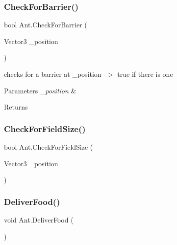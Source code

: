 \subsubsection{\texorpdfstring{CheckForBarrier()}{CheckForBarrier()}}
{\footnotesize\ttfamily bool Ant.\+Check\+For\+Barrier (\begin{DoxyParamCaption}\item[{Vector3}]{\+\_\+position }\end{DoxyParamCaption})\hspace{0.3cm}{\ttfamily [protected]}}



checks for a barrier at \+\_\+position -\/$>$ true if there is one 


\begin{DoxyParams}{Parameters}
{\em \+\_\+position} & \\
\hline
\end{DoxyParams}
\begin{DoxyReturn}{Returns}

\end{DoxyReturn}
\mbox{\label{class_ant_a9c342e2d6f14a75860f518ee1086a255}} 
\subsubsection{\texorpdfstring{CheckForFieldSize()}{CheckForFieldSize()}}
{\footnotesize\ttfamily bool Ant.\+Check\+For\+Field\+Size (\begin{DoxyParamCaption}\item[{Vector3}]{\+\_\+position }\end{DoxyParamCaption})\hspace{0.3cm}{\ttfamily [protected]}}

\mbox{\label{class_ant_a4c67d1cee8cafa2f97495eda2a27a420}} 
\subsubsection{\texorpdfstring{DeliverFood()}{DeliverFood()}}
{\footnotesize\ttfamily void Ant.\+Deliver\+Food (\begin{DoxyParamCaption}{ }\end{DoxyParamCaption})\hspace{0.3cm}{\ttfamily [protected]}}



